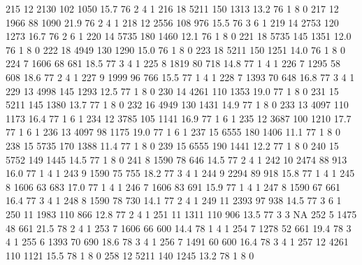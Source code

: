 \documentclass{article}
\begin{document}
\begin{Schunk}
\begin{Soutput}
215      12  2130 102 1050 15.7  76      2       4        1
216      18  5211 150 1313 13.2  76      1       8        0
217      12  1966  88 1090 21.9  76      2       4        1
218      12  2556 108  976 15.5  76      3       6        1
219      14  2753 120 1273 16.7  76      2       6        1
220      14  5735 180 1460 12.1  76      1       8        0
221      18  5735 145 1351 12.0  76      1       8        0
222      18  4949 130 1290 15.0  76      1       8        0
223      18  5211 150 1251 14.0  76      1       8        0
224       7  1606  68  681 18.5  77      3       4        1
225       8  1819  80  718 14.8  77      1       4        1
226       7  1295  58  608 18.6  77      2       4        1
227       9  1999  96  766 15.5  77      1       4        1
228       7  1393  70  648 16.8  77      3       4        1
229      13  4998 145 1293 12.5  77      1       8        0
230      14  4261 110 1353 19.0  77      1       8        0
231      15  5211 145 1380 13.7  77      1       8        0
232      16  4949 130 1431 14.9  77      1       8        0
233      13  4097 110 1173 16.4  77      1       6        1
234      12  3785 105 1141 16.9  77      1       6        1
235      12  3687 100 1210 17.7  77      1       6        1
236      13  4097  98 1175 19.0  77      1       6        1
237      15  6555 180 1406 11.1  77      1       8        0
238      15  5735 170 1388 11.4  77      1       8        0
239      15  6555 190 1441 12.2  77      1       8        0
240      15  5752 149 1445 14.5  77      1       8        0
241       8  1590  78  646 14.5  77      2       4        1
242      10  2474  88  913 16.0  77      1       4        1
243       9  1590  75  755 18.2  77      3       4        1
244       9  2294  89  918 15.8  77      1       4        1
245       8  1606  63  683 17.0  77      1       4        1
246       7  1606  83  691 15.9  77      1       4        1
247       8  1590  67  661 16.4  77      3       4        1
248       8  1590  78  730 14.1  77      2       4        1
249      11  2393  97  938 14.5  77      3       6        1
250      11  1983 110  866 12.8  77      2       4        1
251      11  1311 110  906 13.5  77      3       3       NA
252       5  1475  48  661 21.5  78      2       4        1
253       7  1606  66  600 14.4  78      1       4        1
254       7  1278  52  661 19.4  78      3       4        1
255       6  1393  70  690 18.6  78      3       4        1
256       7  1491  60  600 16.4  78      3       4        1
257      12  4261 110 1121 15.5  78      1       8        0
258      12  5211 140 1245 13.2  78      1       8        0

\end{Soutput}
\end{Schunk}
\end{document}
